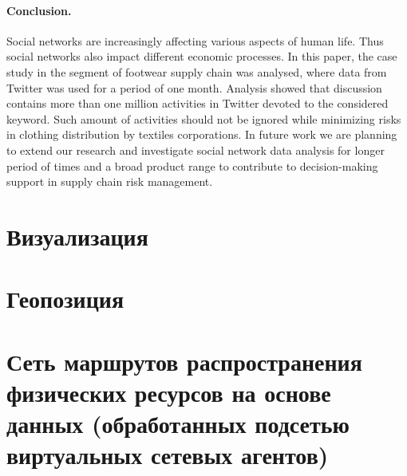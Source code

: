 \paragraph{Conclusion.} Social networks are increasingly affecting various aspects of human life. Thus social networks also impact different economic processes. In this paper, the case study in the segment of footwear supply chain was analysed, where data from Twitter was used for a period of one month. Analysis showed that discussion contains more than one million activities in Twitter devoted to the considered keyword. Such amount of activities should not be ignored while minimizing risks in clothing distribution by textiles corporations. In future work we are planning to extend our research and investigate social network data analysis for longer period of times and a broad product range to contribute to decision-making support in supply chain risk management.

\section{Визуализация}\label{sec:ch6/sect2}

\section{Геопозиция}\label{sec:ch6/sect3}

\section{Сеть маршрутов распространения физических ресурсов на основе данных (обработанных подсетью виртуальных сетевых агентов)}\label{sec:ch6/sect4}

\FloatBarrier

